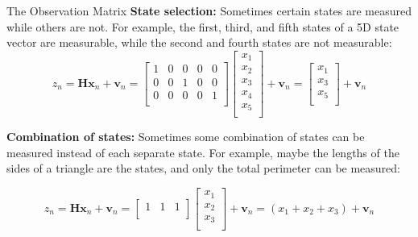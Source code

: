 \begin{frame}{The Observation Matrix}
\textbf{State selection:} Sometimes certain states are measured while others are not. For example, the first,
third, and fifth states of a 5D state vector are measurable, while the second and fourth states are not measurable:
$$z_n = \mathbf{H}\mathbf{x}_n + \mathbf{v}_n = 
\begin{bmatrix}
1 & 0 & 0 & 0 & 0 \\
0 & 0 & 1 & 0 & 0 \\
0 & 0 & 0 & 0 & 1 \\
\end{bmatrix}
\begin{bmatrix}
x_1 \\
x_2 \\
x_3 \\
x_4 \\
x_5 \\
\end{bmatrix}
+ \mathbf{v}_n = 
\begin{bmatrix}
x_1 \\
x_3 \\
x_5 \\
\end{bmatrix}
+ \mathbf{v}_n$$

\textbf{Combination of states:} Sometimes some combination of states can be measured instead of each separate
state. For example, maybe the lengths of the sides of a triangle are the states, and only the total perimeter can be measured:

$$z_n = \mathbf{H}\mathbf{x}_n + \mathbf{v}_n = 
\begin{bmatrix}
1 & 1 & 1 \\
\end{bmatrix}
\begin{bmatrix}
x_1 \\
x_2 \\
x_3 \\
\end{bmatrix}
+ \mathbf{v}_n = (x_1 + x_2 + x_3) + \mathbf{v}_n$$

\end{frame}
